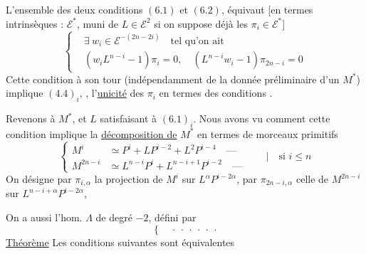  L'ensemble des deux conditions $(6.1)$ et $(6.2)$, équivaut [en termes intrinsèques : $\mathcal E^*$, muni de $L\in\mathcal E^2$ si on suppose déjà les $\pi_i\in\mathcal E^*$]
\[
\left\{\begin{aligned}
&\exists\ w_i\in\mathcal E^{-(2n-2i)}\quad\text{tel qu'on ait}\\
&(w_iL^{n-i}-1)\pi_i=0,\quad(L^{n-i}w_i-1)\pi_{2n-i}=0
\end{aligned}\right.
\tag*{$(6.3.)_i$}
\]
Cette condition à son tour (indépendamment de la donnée préliminaire d'un $M^*$) implique $(4.4)_i$, ,  l'\uline{unicité} des $\pi_i$ en termes des conditions .

Revenons à $M^*$, et $L$ satisfaisant à $(6.1)_i$. Nous avons vu comment  cette condition implique la \uline{décomposition de} $M^*$ en termes  de morceaux primitifs
\[
\left\{\begin{aligned}
M^i&\simeq P^i+LP^{i-2}+L^2P^{i-4}\quad\text{---}\\
M^{2n-i}&\simeq L^{n-i}P^i+L^{n-i+1}P^{i-2}\quad\text{---}
\end{aligned}\right.\qquad\bigg|\quad\text{si }i\leq n
\tag{6.4}
\]
On désigne par $\pi_{i,\alpha}$ la projection de $M^i$ sur $L^\alpha P^{i-2\alpha}$, par $\pi_{2n-i,\alpha}$ celle de $M^{2n-i}$ sur $L^{n-i+\alpha}P^{i-2\alpha}$,

On a aussi l'hom. $\Lambda$ de degré $-2$, défini par
\[
\left\{\quad\cdot\ \cdot\ \cdot\ \cdot\ \cdot\ \cdot\right.
\tag{6.5}
\]
\uline{Théorème} Les conditions suivantes  sont équivalentes


